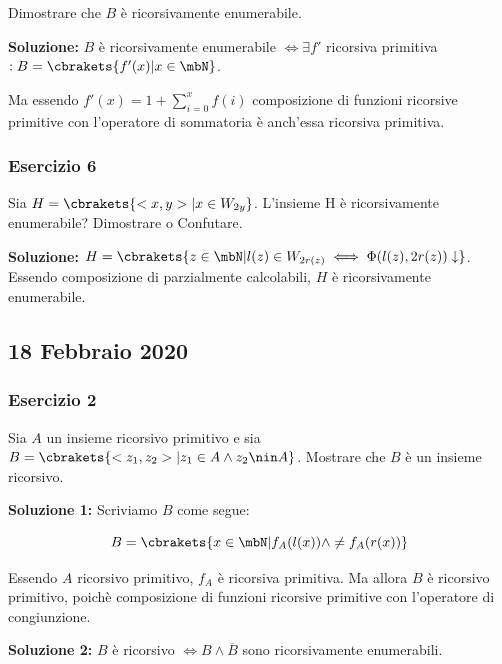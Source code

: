 Dimostrare che \(B\) è ricorsivamente enumerabile.

\textbf{Soluzione: } \(B\) è ricorsivamente enumerabile \(\iff \exists f'\) ricorsiva primitiva \(: B=\cbrakets{f'(x) \vert x \in \mbN}\).

Ma essendo \(f'(x)=1+\sum_{i=0}^{x} f(i)\) composizione di funzioni ricorsive primitive con l'operatore di sommatoria è anch'essa ricorsiva primitiva.

\subsubsection{Esercizio 6}

Sia \(H=\cbrakets{<x,y> \vert x \in W_{2y}}\). L'insieme H è ricorsivamente enumerabile? Dimostrare o Confutare.

\textbf{Soluzione: } \(H=\cbrakets{z \in \mbN \vert l(z) \in W_{2r(z)} \iff \Phi(l(z), 2r(z)) \downarrow}\). Essendo composizione di parzialmente calcolabili, \(H\) è ricorsivamente enumerabile.

\newpage

\subsection{18 Febbraio 2020}

\subsubsection{Esercizio 2}

Sia \(A\) un insieme ricorsivo primitivo e sia \(B=\cbrakets{<z_1,z_2> \vert z_1 \in A \land z_2 \nin A}\). Mostrare che \(B\) è un insieme ricorsivo.

\textbf{Soluzione 1: } Scriviamo \(B\) come segue:

\begin{equation}
  B=\cbrakets{x \in \mbN \vert f_A(l(x)) \land \neq f_A(r(x))}
\end{equation}

Essendo \(A\) ricorsivo primitivo, \(f_A\) è ricorsiva primitiva. Ma allora \(B\) è ricorsivo primitivo, poichè composizione di funzioni ricorsive primitive con l'operatore di congiunzione.

\textbf{Soluzione 2: } \(B\) è ricorsivo \(\iff B \land \overline{B}\) sono ricorsivamente enumerabili.

